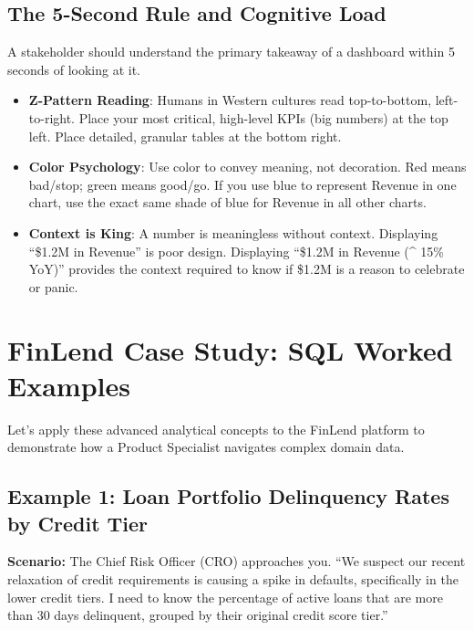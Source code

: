 \documentclass[
  11pt,
  openany,
  oneside]{book}
\providecommand{\tightlist}{%
  \setlength{\itemsep}{0pt}\setlength{\parskip}{0pt}}
\begin{document}
\subsection{The 5-Second Rule and Cognitive
Load}\label{the-5-second-rule-and-cognitive-load}

A stakeholder should understand the primary takeaway of a dashboard
within 5 seconds of looking at it.

\begin{itemize}
\tightlist
\item
  \textbf{Z-Pattern Reading}: Humans in Western cultures read
  top-to-bottom, left-to-right. Place your most critical, high-level
  KPIs (big numbers) at the top left. Place detailed, granular tables at
  the bottom right.
\item
  \textbf{Color Psychology}: Use color to convey meaning, not
  decoration. Red means bad/stop; green means good/go. If you use blue
  to represent Revenue in one chart, use the exact same shade of blue
  for Revenue in all other charts.
\item
  \textbf{Context is King}: A number is meaningless without context.
  Displaying ``\$1.2M in Revenue'' is poor design. Displaying ``\$1.2M
  in Revenue (\^{} 15\% YoY)'' provides the context required to know if
  \$1.2M is a reason to celebrate or panic.
\end{itemize}

\bigskip

\section{FinLend Case Study: SQL Worked
Examples}\label{finlend-case-study-sql-worked-examples}

Let's apply these advanced analytical concepts to the FinLend platform
to demonstrate how a Product Specialist navigates complex domain data.

\subsection{Example 1: Loan Portfolio Delinquency Rates by Credit
Tier}\label{example-1-loan-portfolio-delinquency-rates-by-credit-tier}

\textbf{Scenario:} The Chief Risk Officer (CRO) approaches you. ``We
suspect our recent relaxation of credit requirements is causing a spike
in defaults, specifically in the lower credit tiers. I need to know the
percentage of active loans that are more than 30 days delinquent,
grouped by their original credit score tier.''
\end{document}
